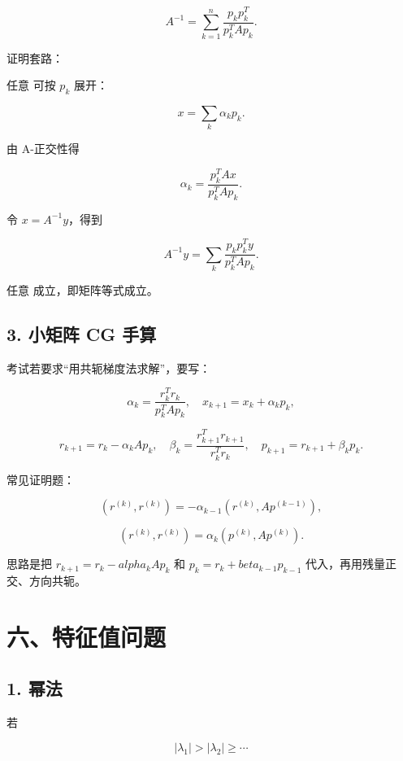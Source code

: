 \documentclass[11pt,a4paper]{ctexart}
\newcommand{\code}[1]{\begingroup\ttfamily\small #1\endgroup}
\begin{document}
\[
A^{-1}=\sum_{k=1}^n
\frac{p_kp_k^T}{p_k^T A p_k}.
\]

证明套路：

任意 \code{} 可按 $p_k$ 展开：

\[
x=\sum_k \alpha_k p_k.
\]

由 A-正交性得

\[
\alpha_k=\frac{p_k^T A x}{p_k^T A p_k}.
\]

令 $x=A^{-1}y$，得到

\[
A^{-1}y=\sum_k
\frac{p_k p_k^T y}{p_k^T A p_k}.
\]

任意 \code{} 成立，即矩阵等式成立。


\subsection*{3. 小矩阵 CG 手算}


考试若要求“用共轭梯度法求解”，要写：

\[
\alpha_k=\frac{r_k^Tr_k}{p_k^TAp_k},\quad
x_{k+1}=x_k+\alpha_k p_k,
\]

\[
r_{k+1}=r_k-\alpha_k Ap_k,\quad
\beta_k=\frac{r_{k+1}^Tr_{k+1}}{r_k^Tr_k},\quad
p_{k+1}=r_{k+1}+\beta_kp_k.
\]

常见证明题：

\[
(r^{(k)},r^{(k)})=-\alpha_{k-1}(r^{(k)},Ap^{(k-1)}),
\]

\[
(r^{(k)},r^{(k)})=\alpha_k(p^{(k)},Ap^{(k)}).
\]

思路是把 $r_{k+1}=r_k-alpha_k Ap_k$ 和 $p_k=r_k+beta_{k-1}p_{k-1}$ 代入，再用残量正交、方向共轭。


\section*{六、特征值问题}



\subsection*{1. 幂法}


若

\[
|\lambda_1|>|\lambda_2|\ge \cdots
\]
\end{document}
